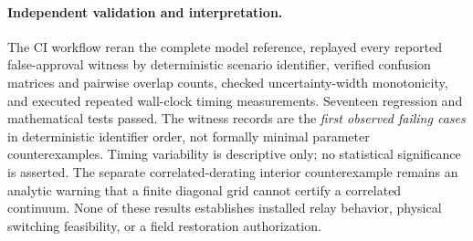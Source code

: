 \paragraph{Independent validation and interpretation.}
The CI workflow reran the complete model reference, replayed every reported false-approval witness by deterministic scenario identifier, verified confusion matrices and pairwise overlap counts, checked uncertainty-width monotonicity, and executed repeated wall-clock timing measurements. Seventeen regression and mathematical tests passed. The witness records are the \emph{first observed failing cases} in deterministic identifier order, not formally minimal parameter counterexamples. Timing variability is descriptive only; no statistical significance is asserted. The separate correlated-derating interior counterexample remains an analytic warning that a finite diagonal grid cannot certify a correlated continuum. None of these results establishes installed relay behavior, physical switching feasibility, or a field restoration authorization.